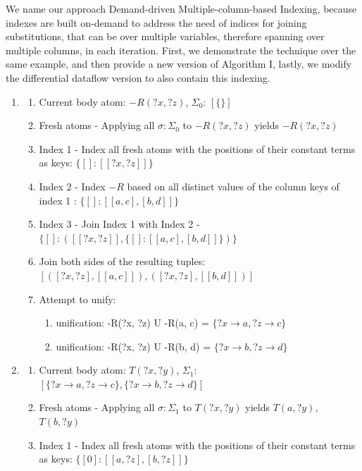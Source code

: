 \documentclass[sigconf,screen,review,natbib]{acmart}
\theoremstyle{definition}
\begin{document}
We name our approach Demand-driven Multiple-column-based Indexing, because indexes are built on-demand to address the need of indices for
joining substitutions, that can be over multiple variables, therefore spanning over multiple columns, in each iteration. First, we demonstrate
the technique over the same example, and then provide a new version of Algorithm I, lastly, we modify the differential dataflow version to
also contain this indexing.
\begin{enumerate}
	\item \begin{enumerate}
		      \item Current body atom: $-R(?x, ?z)$, $\Sigma_0$: $[\{\}]$
		      \item Fresh atoms - Applying all $\sigma : \Sigma_0$ to $-R(?x, ?z)$ yields $-R(?x, ?z)$
		      \item Index 1 - Index all fresh atoms with the positions of their constant terms as keys: $\{[] : [[?x, ?z]]\}$
		      \item Index 2 - Index $-R$ based on all distinct values of the column keys of index 1 : $\{[]: [[a, c], [b, d]]\}$
		      \item Index 3 - Join Index 1 with Index 2 - $\{[] : ([[?x, ?z]], \{[]: [[a, c], [b, d]]\})\}$
		      \item Join both sides of the resulting tuples: $[([?x, ?z], [[a, c]]), ([?x, ?z], [[b, d]])]$
		      \item Attempt to unify:
		            \begin{enumerate}
			            \item unification: -R(?x, ?z) U -R(a, c) = $\{?x \rightarrow a, ?z \rightarrow c\}$
			            \item unification: -R(?x, ?z) U -R(b, d) = $\{?x \rightarrow b, ?z \rightarrow d\}$
		            \end{enumerate}
	      \end{enumerate}
	\item \begin{enumerate}
		      \item Current body atom: $T(?x, ?y)$, $\Sigma_1$: $[\{?x \rightarrow a, ?z \rightarrow c\}, \{?x \rightarrow b, ?z \rightarrow d\}]$
		      \item Fresh atoms - Applying all $\sigma : \Sigma_1$ to $T(?x, ?y)$ yields $T(a, ?y)$, $T(b, ?y)$
		      \item Index 1 - Index all fresh atoms with the positions of their constant terms as keys: $\{[0] : [[a, ?z], [b, ?z]]\}$

\end{enumerate}
\end{enumerate}
\end{document}
